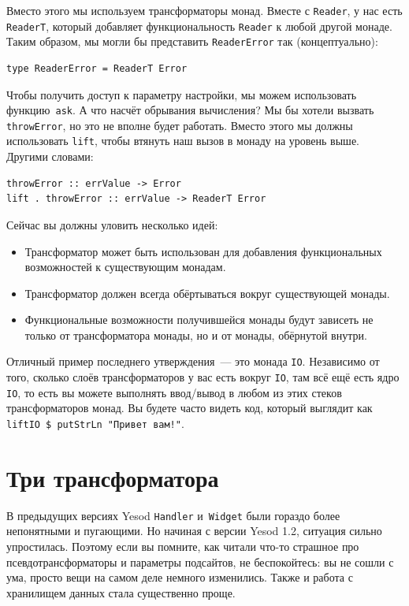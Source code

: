Вместо этого мы используем трансформаторы монад. Вместе с \lstinline'Reader', у
нас есть \lstinline'ReaderT', который добавляет функциональность
\lstinline'Reader' к любой другой монаде. Таким образом, мы могли бы представить
\lstinline'ReaderError' так (концептуально):
\begin{lstlisting}
type ReaderError = ReaderT Error
\end{lstlisting}

Чтобы получить доступ к параметру настройки, мы можем использовать
функцию~\lstinline'ask'. А что насчёт обрывания вычисления? Мы бы хотели вызвать
\lstinline'throwError', но это не вполне будет работать. Вместо этого мы должны
использовать \lstinline'lift', чтобы втянуть наш вызов в монаду на уровень
выше. Другими словами:
\begin{lstlisting}
throwError :: errValue -> Error
lift . throwError :: errValue -> ReaderT Error
\end{lstlisting}

Сейчас вы должны уловить несколько идей:
\begin{itemize}
    \item  Трансформатор может быть использован для добавления функциональных
        возможностей к существующим монадам.
    \item  Трансформатор должен всегда обёртываться вокруг существующей монады.
    \item  Функциональные возможности получившейся монады будут зависеть не
        только от трансформатора монады, но и от монады, обёрнутой внутри.
\end{itemize}

Отличный пример последнего утверждения~--- это монада \lstinline'IO'. Независимо
от того, сколько слоёв трансформаторов у вас есть вокруг \lstinline'IO', там всё
ещё есть ядро \lstinline'IO', то есть вы можете выполнять ввод/вывод в любом из
этих стеков трансформаторов монад. Вы будете часто видеть код, который выглядит
как \lstinline'liftIO $ putStrLn "Привет вам!"'.

\section{Три трансформатора}
\begin{remark}
    В предыдущих версиях Yesod \lstinline'Handler' и~\lstinline'Widget' были
    гораздо более непонятными и пугающими. Но начиная с версии Yesod 1.2,
    ситуация сильно упростилась. Поэтому если вы помните, как читали что-то
    страшное про псевдотрансформаторы и параметры подсайтов, не беспокойтесь:
    вы не сошли с ума, просто вещи на самом деле немного изменились. Также и
    работа с хранилищем данных стала существенно проще.
\end{remark}

